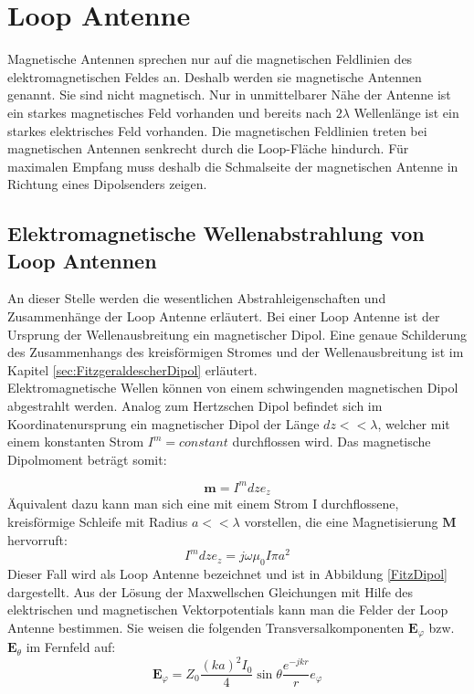 \section{Loop Antenne}
Magnetische Antennen sprechen nur auf die magnetischen Feldlinien des elektromagnetischen Feldes an. Deshalb werden sie magnetische Antennen genannt. Sie sind nicht magnetisch. Nur in unmittelbarer Nähe der Antenne ist ein starkes magnetisches Feld vorhanden und bereits nach $2\lambda$ Wellenlänge ist ein starkes elektrisches Feld vorhanden. Die magnetischen Feldlinien treten bei magnetischen Antennen senkrecht durch die Loop-Fläche hindurch. Für maximalen Empfang muss deshalb die Schmalseite der magnetischen Antenne in Richtung eines Dipolsenders  zeigen.

\subsection{Elektromagnetische Wellenabstrahlung von Loop Antennen}
An dieser Stelle werden die wesentlichen Abstrahleigenschaften und Zusammenhänge  der Loop Antenne erläutert.
Bei einer Loop Antenne ist der Ursprung der Wellenausbreitung ein magnetischer Dipol. Eine genaue Schilderung des Zusammenhangs des kreisförmigen Stromes und der Wellenausbreitung ist im Kapitel \ref{sec:FitzgeraldescherDipol} erläutert. \\
Elektromagnetische Wellen können  von einem schwingenden magnetischen Dipol
abgestrahlt werden. Analog zum Hertzschen Dipol befindet sich im Koordinatenursprung
ein magnetischer Dipol der Länge $dz<<\lambda$, welcher mit einem konstanten
Strom $I^{m}=constant$ durchflossen wird. Das magnetische Dipolmoment beträgt somit:

\begin{equation}
\textbf{m}=I^{m}dze_z
\end{equation}
Äquivalent dazu kann man sich eine mit einem Strom I durchflossene, kreisförmige Schleife mit Radius $a<<\lambda$ vorstellen, die eine Magnetisierung $\textbf{M}$ hervorruft:
\begin{equation}
I^{m}dze_{z}=j\omega\mu_{0}I\pi a^{2}
\end{equation}
Dieser Fall wird als Loop Antenne bezeichnet und ist in Abbildung \ref{FitzDipol} dargestellt. Aus der Lösung der Maxwellschen Gleichungen mit Hilfe des elektrischen und
magnetischen Vektorpotentials kann man die Felder der Loop Antenne bestimmen.
Sie weisen die folgenden Transversalkomponenten $\textbf{E}_{\varphi}$ bzw.$\textbf{E}_{\theta}$ im Fernfeld auf:
\begin{equation}
\textbf{E}_{\varphi}=Z_{0}\dfrac{(ka)^2I_{0}}{4}\sin \theta \dfrac{e^{-jkr}}{r} e_{\varphi}
\end{equation}

